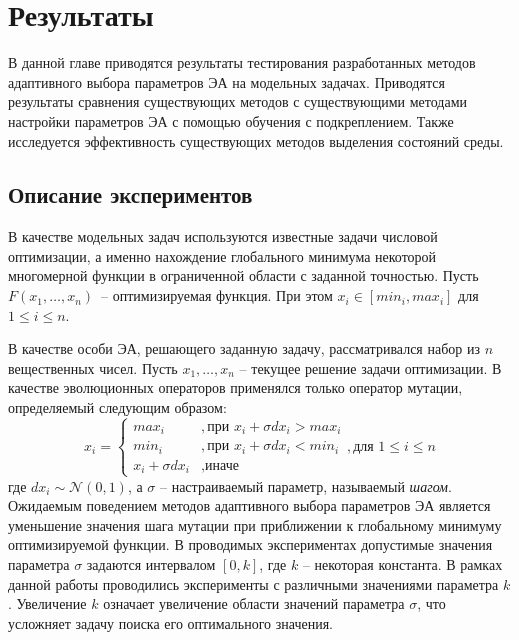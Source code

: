 \chapter{Результаты}
\label{chapter_results}

В данной главе приводятся результаты тестирования разработанных методов адаптивного выбора параметров ЭА на модельных задачах. Приводятся результаты сравнения существующих методов с существующими методами настройки параметров ЭА с помощью обучения с подкреплением. Также исследуется эффективность существующих методов выделения состояний среды.


\section{Описание экспериментов}

В качестве модельных задач используются известные задачи числовой оптимизации, а именно нахождение глобального минимума некоторой многомерной функции в ограниченной области с заданной точностью. Пусть $F(x_1, \ldots, x_n)$~-- оптимизируемая функция. При этом $x_i \in [min_i, max_i]$ для $1 \le i \le n$.

В качестве особи ЭА, решающего заданную задачу, рассматривался набор из $n$ вещественных чисел. Пусть $x_1, \ldots, x_n$ -- текущее решение задачи оптимизации. В качестве эволюционных операторов применялся только оператор мутации, определяемый следующим образом:
\begin{equation}
x_i = \begin{cases}
	max_i &, \text{при } x_i + \sigma dx_i > max_i \\
	min_i &, \text{при } x_i + \sigma dx_i < min_i \\
	x_i + \sigma dx_i &, \text{иначе}
      \end{cases}, \text{для } 1 \le i \le n
\end{equation}
где $dx_i \sim \mathcal{N}(0, 1)$, а $\sigma$ -- настраиваемый параметр, называемый \textit{шагом}. Ожидаемым поведением методов адаптивного выбора параметров ЭА является уменьшение значения шага мутации при приближении к глобальному минимуму оптимизируемой функции. В проводимых экспериментах допустимые значения параметра $\sigma$ задаются интервалом $[0, k]$, где $k$ -- некоторая константа. В рамках данной работы проводились эксперименты с различными значениями параметра $k$. Увеличение $k$ означает увеличение области значений параметра $\sigma$, что усложняет задачу поиска его оптимального значения.

